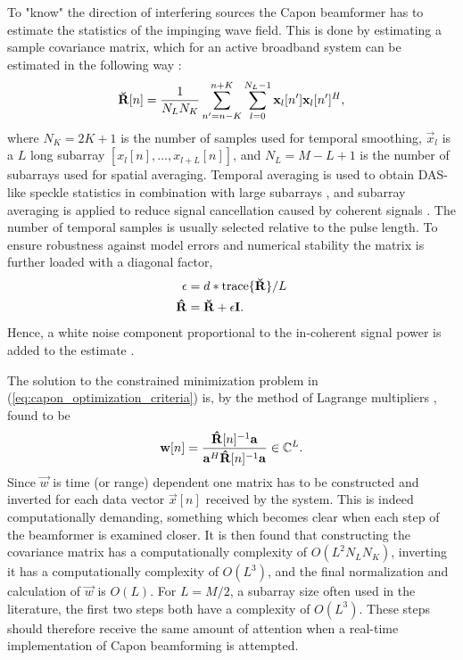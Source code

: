 To "know" the direction of interfering sources the Capon beamformer has to estimate the statistics of the impinging wave field. This is done by estimating a sample covariance matrix, which for an active broadband system can be estimated in the following way \cite{Synnevag2009}:
\begin{align}
\mathbf{\breve{R}}[n] = \frac{1}{N_LN_K}\sum_{n'=n-K}^{n+K} \sum_{l=0}^{N_L-1} \mathbf{x}_l[n']\mathbf{x}_l[n']^H,
\end{align}
where $N_K = 2K + 1$  is the number of samples used for temporal smoothing, $\vec{x}_l$ is a $L$ long subarray $[x_l[n], \dotso, x_{l+L}[n]]$, and $N_L = M-L+1$ is the number of subarrays used for spatial averaging.  Temporal averaging is used to obtain DAS-like speckle statistics in combination with large subarrays \cite{Synnevag2007a}, and subarray averaging is applied to reduce signal cancellation caused by coherent signals \cite{Reddy1987}. The number of temporal samples is usually selected relative to the pulse length. To ensure robustness against model errors and numerical stability the matrix is further loaded with a diagonal factor, 
\begin{align}
\epsilon &= d*\text{trace}\{\mathbf{\breve{R}}\}/L\\
\mathbf{\hat{R}} &= \mathbf{\breve{R}} + \epsilon\mathbf{I}.
\end{align} 
Hence, a white noise component proportional to the in-coherent signal power is added to the estimate \cite{Featherstone1997b}.

The solution to the constrained minimization problem in (\ref{eq:capon_optimization_criteria}) is, by the method of Lagrange multipliers \cite{VanTrees2003}, found to be
\begin{align}\label{eq:capon_weights}
\mathbf{w}[n] = \frac{\mathbf{\hat{R}}[n]^{-1}\mathbf{a}}{\mathbf{a}^H\mathbf{\hat{R}}[n]^{-1}\mathbf{a}} \in \mathbb{C}^L.
\end{align}
Since $\vec{w}$ is time (or range) dependent one matrix has to be constructed and inverted for each data vector $\vec{x}[n]$ received by the system. This is indeed computationally demanding, something which becomes clear when each step of the beamformer is examined closer. It is then found that constructing the covariance matrix has a computationally complexity of $O(L^2N_LN_K)$, inverting it has a computationally complexity of $O(L^3)$, and the final normalization and calculation of $\vec{w}$ is $O(L)$. For $L=M/2$, a subarray size often used in the literature, the first two steps both have a complexity of $O(L^3)$. These steps should therefore receive the same amount of attention when a real-time implementation of Capon beamforming is attempted.

